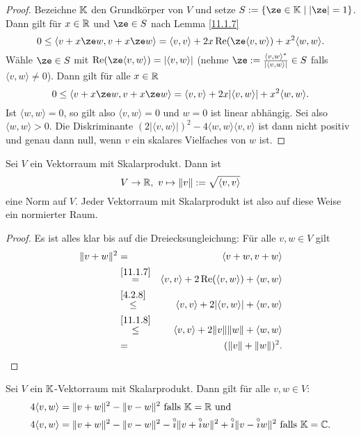 \documentclass[../../main.tex]{subfiles}
\begin{document}
\begin{proof}
Bezeichne $\mathbb K$ den Grundkörper von $V$ und setze $S:=\{\ze\in\K\mid|\ze|=1\}$. Dann gilt für $x\in\mathbb R$ und $\ze\in S$ nach Lemma \ref{11.1.7}
\[0\le\langle v+x\ze w,v+x\ze w\rangle=\langle v,v\rangle+2x\rp(\ze\langle v,w\rangle)+x^2\langle w,w\rangle.\]
Wähle $\ze\in S$ mit $\rp(\ze\langle v,w\rangle)=|\langle v,w\rangle|$ (nehme $\ze:=\frac{\langle v,w\rangle^*}{|\langle v,w\rangle|}\in S$ falls
$\langle v,w\rangle\ne0$). Dann gilt für alle $x\in\mathbb R$
\[0\le\langle v+x\ze w,v+x\ze w\rangle=\langle v,v\rangle+2x|\langle v,w\rangle|+x^2\langle w,w\rangle.\]
Ist $\langle w,w\rangle=0$, so gilt also $\langle v,w\rangle=0$ und $w=0$ ist linear abhängig. Sei also $\langle w,w\rangle>0$.
Die Diskriminante $(2|\langle v,w\rangle|)^2-4\langle w,w\rangle\langle v,v\rangle$ ist dann nicht positiv und genau dann null, wenn $v$ ein skalares Vielfaches von $w$ ist.
\end{proof}

\begin{sat}\label{11.1.9}
Sei $V$ ein Vektorraum mit Skalarprodukt. Dann ist \[V\to\mathbb R,\ v\mapsto\|v\|:=\sqrt{\langle v,v\rangle}\] eine Norm auf $V$. Jeder Vektorraum mit Skalarprodukt ist
also auf diese Weise ein normierter Raum.
\end{sat}

\begin{proof} Es ist alles klar bis auf die Dreiecksungleichung: Für alle $v,w\in V$ gilt
\begin{eqnarray*}
\|v+w\|^2&=&\langle v+w,v+w\rangle\\
&\overset{\ref{11.1.7}}=&\langle v,v\rangle+2\operatorname{Re}(\langle v,w\rangle)+\langle w,w\rangle\\
&\overset{\ref{4.2.8}}\le&\langle v,v\rangle+2|\langle v,w\rangle|+\langle w,w\rangle\\
&\overset{\ref{11.1.8}}\le&\langle v,v\rangle+2\|v\|\|w\|+\langle w,w\rangle\\
&=&(\|v\|+\|w\|)^2.
\end{eqnarray*}
\end{proof}

\begin{sat}[Polarisationsformel]\label{11.1.10}
Sei $V$ ein $\mathbb K$-Vektorraum mit Skalarprodukt. Dann gilt für alle $v,w\in V$:
\begin{align*}
4\langle v,w\rangle&=\|v+w\|^2-\|v-w\|^2\text{ falls $\mathbb K=\mathbb R$ und}\\
4\langle v,w\rangle&=\|v+w\|^2-\|v-w\|^2-\overset\circ\imath\|v+\overset\circ\imath w\|^2+\overset\circ\imath\|v-\overset\circ\imath w\|^2\text{ falls $\mathbb K=\mathbb C$.}
\end{align*}
\end{sat}
\end{document}
